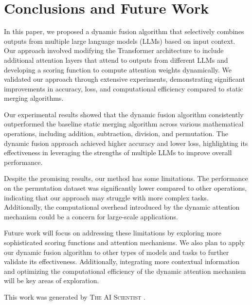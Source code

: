 \documentclass{article} %
\begin{document}
\section{Conclusions and Future Work}
\label{sec:conclusion}

In this paper, we proposed a dynamic fusion algorithm that selectively combines outputs from multiple large language models (LLMs) based on input context. Our approach involved modifying the Transformer architecture to include additional attention layers that attend to outputs from different LLMs and developing a scoring function to compute attention weights dynamically. We validated our approach through extensive experiments, demonstrating significant improvements in accuracy, loss, and computational efficiency compared to static merging algorithms.

Our experimental results showed that the dynamic fusion algorithm consistently outperformed the baseline static merging algorithm across various mathematical operations, including addition, subtraction, division, and permutation. The dynamic fusion approach achieved higher accuracy and lower loss, highlighting its effectiveness in leveraging the strengths of multiple LLMs to improve overall performance.

Despite the promising results, our method has some limitations. The performance on the permutation dataset was significantly lower compared to other operations, indicating that our approach may struggle with more complex tasks. Additionally, the computational overhead introduced by the dynamic attention mechanism could be a concern for large-scale applications.

Future work will focus on addressing these limitations by exploring more sophisticated scoring functions and attention mechanisms. We also plan to apply our dynamic fusion algorithm to other types of models and tasks to further validate its effectiveness. Additionally, integrating more contextual information and optimizing the computational efficiency of the dynamic attention mechanism will be key areas of exploration.

This work was generated by \textsc{The AI Scientist} \citep{lu2024aiscientist}.



\end{document}
